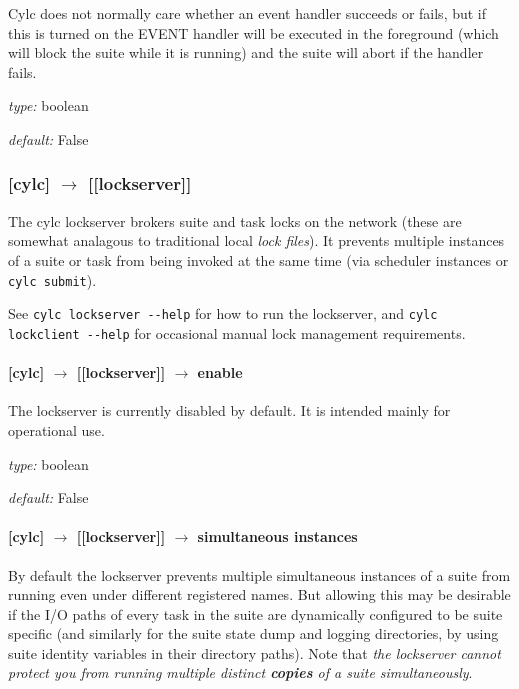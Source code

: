 Cylc does not normally care whether an event handler succeeds or fails,
but if this is turned on the EVENT handler will be executed in the
foreground (which will block the suite while it is running) and the
suite will abort if the handler fails.

\begin{myitemize}
    \item {\em type:} boolean
    \item {\em default:} False
\end{myitemize}

\subsubsection[{[[}lockserver{]]}]{[cylc] $\rightarrow$ [[lockserver]]}

The cylc lockserver brokers suite and task locks on the network (these
are somewhat analagous to traditional local {\em lock files}). It
prevents multiple instances of a suite or task from being invoked
at the same time (via scheduler instances or \lstinline=cylc submit=).

See \lstinline=cylc lockserver --help= for
how to run the lockserver, and \lstinline=cylc lockclient --help= for
occasional manual lock management requirements.

\paragraph[enable]{[cylc] $\rightarrow$ [[lockserver]] $\rightarrow$ enable}

The lockserver is currently disabled by default. It is intended mainly for
operational use.

\begin{myitemize}
    \item {\em type:} boolean
    \item {\em default:} False
\end{myitemize}

\paragraph[simultaneous instances]{[cylc] $\rightarrow$ [[lockserver]] $\rightarrow$ simultaneous instances}

By default the lockserver prevents multiple simultaneous instances of a
suite from running even under different registered names. But allowing
this may be desirable if the I/O paths of every task in the suite are
dynamically configured to be suite specific (and similarly for the suite
state dump and logging directories, by using suite identity variables in
their directory paths). Note that {\em the lockserver cannot protect you
from running multiple distinct {\bf copies} of a suite simultaneously}.

